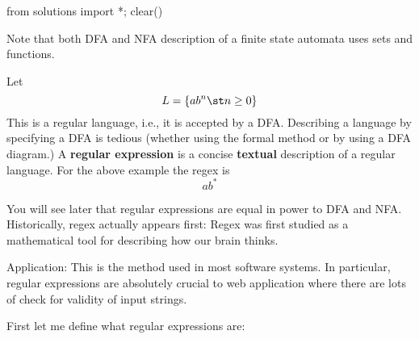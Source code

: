 \begin{python0}
  from solutions import *; clear()
\end{python0}

\begin{comment}
\textbf{Objectives}
\begin{tightlist}
\item Verify if an expression is an regular expression
\item Describe informal the language generated by a regex
\item Given an informal description of a regular language,
  write down the corresponding regex
\item Translate between a regex and a state diagram
\item Translate between a regex and a DFA
\item Translate between a regex and an NFA
\end{tightlist}
\mbox{}
\end{comment}

Note that both DFA and NFA description of a finite state automata
uses sets and functions.

Let
\[
L = \{ a b^n \st n \geq 0 \}
\]
This is a regular language, i.e., it is accepted by a DFA.
Describing a language by specifying a DFA is tedious
(whether using the formal method or by using a DFA diagram.)
A \textbf{regular expression} is a concise \textbf{textual} description
of a regular language. For the above example the regex is
\[
ab^*
\]

You will see later that regular expressions are equal in power to
DFA and NFA. 
Historically, regex actually appears first: 
Regex was first studied as a mathematical tool for describing
how our brain thinks.

Application: This is the method used in most software
systems. In particular, regular expressions are absolutely crucial
to web application where there are lots of check for validity of
input strings.

First let me define what regular expressions are:

